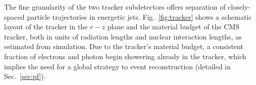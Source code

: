 
The fine granularity of the two tracker subdetectors offers separation of closely-spaced particle
trajectories in energetic jets. Fig.~\ref{fig:tracker} shows a
schematic layout of the tracker in the $r-z$ plane and
the material budget of the CMS tracker, both in units of radiation
lengths and nuclear interaction lengths, as estimated from
simulation. Due to the tracker's material budget, a consistent fraction of
electrons and photon begin showering already in the tracker, which
implies the need for a global strategy to event reconstruction
(detailed in Sec.~\ref{sec:pf}).


